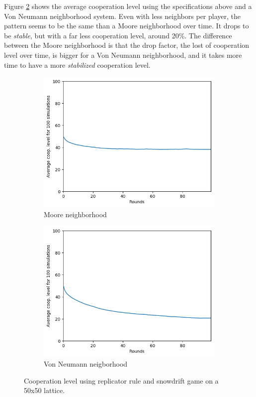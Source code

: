 \documentclass[letterpaper]{article}
\begin{document}
Figure \ref{fig:50vonpart2} shows the average cooperation level using
the specifications above and a Von Neumann neighborhood system. Even
with less neighbors per player, the pattern seems to be the same
than a Moore neighborhood over time.
It drops to be \textit{stable},
but with a far less cooperation level, around 20\%.
The difference between the Moore neighborhood is that the drop factor,
the lost of cooperation level over time, is bigger for a Von Neumann
neighborhood, and it takes more time to have a more \textit{stabilized}
cooperation level.

\begin{figure}[H]
    \begin{subfigure}{.5\textwidth}
        \centering
        \includegraphics[width=1\linewidth]{images/assign2/50-part2}
        \caption{Moore neighborhood}
        \label{fig:50moorepart2}
    \end{subfigure}
    \begin{subfigure}{.5\textwidth}
        \centering
        \includegraphics[width=1\linewidth]{images/assign2/50_vonneumann-part2}
        \caption{Von Neumann neigborhood}
        \label{fig:50vonpart2}
    \end{subfigure}
    \caption{Cooperation level using replicator rule and
    snowdrift game on a 50x50 lattice.}
    \label{fig:50part2}
\end{figure}
\end{document}
